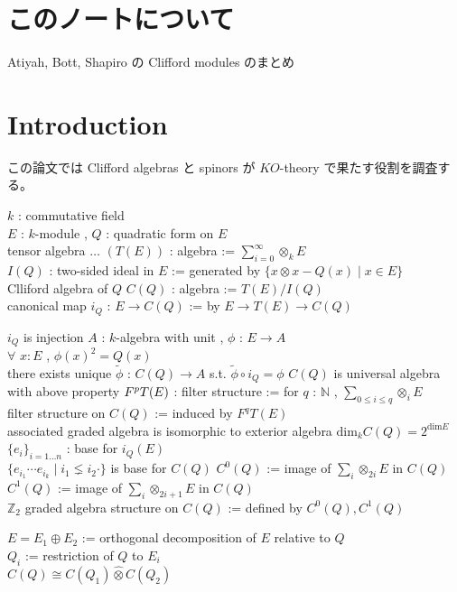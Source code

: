 \documentclass[dvipdfmx]{jsarticle}
\begin{document}
\section*{このノートについて}
Atiyah, Bott, Shapiro の Clifford modules のまとめ

\section*{Introduction}
この論文では Clifford algebras と spinors が \(KO\)-theory で果たす役割を調査する。

\begin{Definition}
\itemwhen
  \Fix \(k\) : commutative field \\
\itemdefi
  \For \(E\) : \(k\)-module , \(Q\) : quadratic form on \(E\) \\
  \Define tensor algebra \(\ldots\) \((T(E))\) : algebra := \(\sum_{i=0}^\infty \otimes_{k} E\) \\
  \Define \(I(Q)\) : two-sided ideal in \(E\) := generated by \(\{x \otimes x - Q(x) \mid x \in E\}\) \\
  \Define Clliford algebra of \(Q\) \(C(Q)\) : algebra := \(T(E) / I(Q)\) \\
  \Define canonical map \(i_Q\) : \(E \to C(Q)\) := by \(E \to T(E) \to C(Q)\) 
\end{Definition}

\begin{Theorem}
\itemprop
  \Then \(i_Q\) is injection
\itemprop
  \For \(A\) : \(k\)-algebra with unit , \(\phi\) : \(E \to A\) \\
  \IfHold \(\forall\) \(x:E\) , \(\phi(x)^2 = Q(x)\) \\
  \Then there exists unique \(\tilde{\phi}\) : \(C(Q) \to A\) s.t. \(\tilde{\phi} \circ i_Q = \phi\)
\itemprop
  \Then \(C(Q)\) is universal algebra with above property
\itemprop
  \Let \(F^{p} T(E)\) : filter structure := for \(q\) : \(\mathbb{N}\) , \(\sum_{0 \leq i \leq q} \otimes_i E\) \\
  \Let filter structure on \(C(Q)\) := induced by \(F^{q} T(E)\) \\
  \Then associated graded algebra is isomorphic to exterior algebra
\itemprop
  \Then \(\text{dim}_k C(Q) = 2^{\text{dim} E}\)
\itemprop
  \For \(\{e_i\}_{i=1 \ldots n}\) : base for \(i_Q(E)\) \\
  \Then \(\{e_{i_1} \cdots e_{i_k} \mid i_1 \lneq i_2 \cdot\}\) is base for \(C(Q)\)
\itemdefi
  \Let \(C^0(Q)\) := image of \(\sum_{i} \otimes_{2i} E\) in \(C(Q)\) \\
  \Let \(C^1(Q)\) := image of \(\sum_{i} \otimes_{2i+1} E\) in \(C(Q)\) \\
  \Then \(\mathbb{Z}_2\) graded algebra structure on \(C(Q)\) := defined by \(C^0(Q) , C^1(Q)\)
\end{Theorem}

\begin{Theorem}
\itemprop
  \For \(E = E_1 \oplus E_2\) := orthogonal decomposition of \(E\) relative to \(Q\) \\
  \Let \(Q_i\) := restriction of \(Q\) to \(E_i\) \\
  \Then \(C(Q) \cong C(Q_1) \hat{\otimes} C(Q_2)\)
\end{Theorem}
\end{document}
